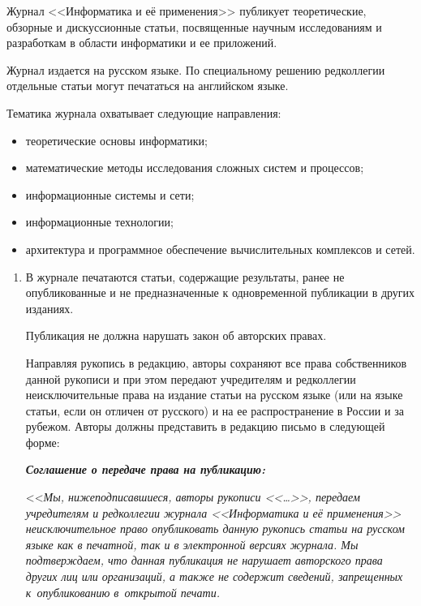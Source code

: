 \vspace*{-60pt}
{ %

Журнал <<Информатика и её применения>>
публикует теоретические, обзорные и дискуссионные статьи,
посвященные научным исследованиям и разработкам в области
информатики и ее приложений.

Журнал издается на русском языке. По специальному решению
редколлегии отдельные статьи могут печататься на английском языке.

Тематика журнала охватывает следующие направления:
\begin{itemize}
\item теоретические основы информатики;\\[-15pt]
      \item
математические методы исследования сложных систем и процессов;\\[-15pt]
           \item
информационные системы и сети;\\[-15pt]
                \item
информационные технологии;\\[-15pt]
                     \item
архитектура и программное обеспечение вычислительных комплексов и сетей.\\[-15pt]
\end{itemize}


\noindent
\begin{enumerate}[1.]
\item В журнале печатаются статьи, содержащие результаты, ранее не опубликованные и
не предназначенные к одновременной публикации в других изданиях.

Публикация не должна нарушать закон об авторских правах.

Направляя рукопись в редакцию, авторы сохраняют все права собственников данной
рукописи и при этом передают учредителям и редколлегии неисключительные права на
издание статьи на русском языке (или на языке статьи, если он отличен от рус\-ско\-го) и на
ее распространение в России и за рубежом. Авторы должны пред\-ста\-вить в редакцию
письмо в следующей форме:

{\bfseries\textit{Соглашение о передаче права на публикацию:}}

\noindent
<<\textit{Мы, нижеподписавшиеся, авторы рукописи <<\ldots>>, передаем учредителям
и редколлегии журнала <<Информатика и её применения>> неисключительное
право опубликовать данную рукопись статьи на русском языке как в печатной, так и в
электронной версиях журнала. Мы подтверждаем, что данная публикация не нарушает
авторского права других лиц или организаций, а также не содержит сведений,
запрещенных к~опубликованию в~открытой печати.}


\end{enumerate}}
